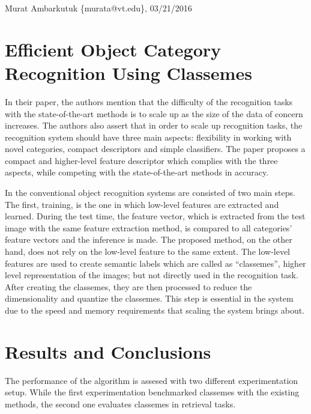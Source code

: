 \documentclass[11pt]{article}
\begin{document}
\thispagestyle{empty}
\begin{flushright}
	\small{Murat Ambarkutuk \{murata@vt.edu\}, 03/21/2016}
\end{flushright}
\section{Efficient Object Category Recognition Using Classemes}
In their paper, the authors mention that the difficulty of the recognition tasks with the state-of-the-art methods is to scale up as the size of the data of concern increases.
The authors also assert that in order to scale up recognition tasks, the recognition system should have three main aspects: flexibility in working with novel categories, compact descriptors and simple classifiers.
The paper proposes a compact and higher-level feature descriptor which complies with the three aspects, while competing with the state-of-the-art methods in accuracy.

In the conventional object recognition systems are consisted of two main steps.
The first, training, is the one in which low-level features are extracted and learned.
During the test time, the feature vector, which is extracted from the test image with the same feature extraction method, is compared to all categories' feature vectors and the inference is made.
The proposed method, on the other hand, does not rely on the low-level feature to the same extent.
The low-level features are used to create semantic labels which are called as ``classemes'', higher level representation of the images; but not directly used in the recognition task.
After creating the classemes, they are then processed to reduce the dimensionality and quantize the classemes.
This step is essential in the system due to the speed and memory requirements that scaling the system brings about.

\section{Results and Conclusions}
The performance of the algorithm is assesed with two different experimentation setup.
While the first experimentation benchmarked classemes with the existing methods, the second one evaluates classemes in retrieval tasks.
\end{document}
